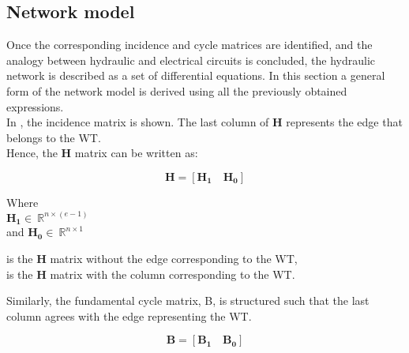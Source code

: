 \subsection{Network model}  
\label{ParameterEstimation}

Once the corresponding incidence and cycle matrices are identified, and the analogy between hydraulic and electrical circuits is concluded, the hydraulic network is described as a set of differential equations. In this section a general form of the network model is derived using all the previously obtained expressions. 
\\
In , the incidence matrix is shown. The last column of $\bm{H}$ represents the edge that belongs to the WT. 
\\
Hence, the $\bm{H}$ matrix can be written as:

\begin {equation}
\bm{H} = [\bm{H_1} \quad \bm{H_0}]
\label{Hmatrix}
\end{equation}

\begin{minipage}[t]{0.24\textwidth}
Where\\
\hspace*{8mm} $\bm{H_1} \in \: \mathbb{R}^{n \times (e-1)}$  \\
and \hspace*{0.4mm} $\bm{H_0} \in \: \mathbb{R}^{n \times 1} $ 
\end{minipage}
\begin{minipage}[t]{0.70\textwidth}
\vspace*{2mm}
\hspace*{4mm} is the $\bm{H}$ matrix without the edge corresponding to the WT,\\
\hspace*{4mm} is the $\bm{H}$ matrix with the column corresponding to the WT. 
\end{minipage}

Similarly, the fundamental cycle matrix, B, is structured such that the last column agrees with the edge representing the WT.

\begin{equation}
  \bm{B} = [\bm{B_1} \quad \bm{B_0}]
\end{equation} 

